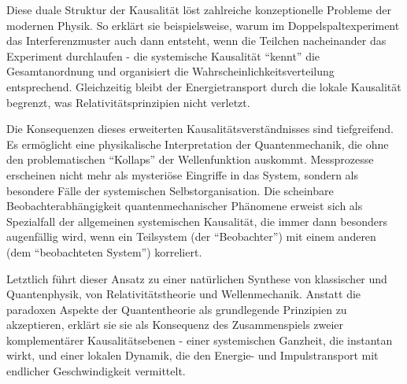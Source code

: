 Diese duale Struktur der Kausalität löst zahlreiche konzeptionelle Probleme der modernen Physik. So erklärt sie beispielsweise, warum im Doppelspaltexperiment das Interferenzmuster
auch dann entsteht, wenn die Teilchen nacheinander das Experiment durchlaufen - die systemische Kausalität \enquote{kennt} die Gesamtanordnung und organisiert die Wahrscheinlichkeitsverteilung
entsprechend. Gleichzeitig bleibt der Energietransport durch die lokale Kausalität begrenzt, was Relativitätsprinzipien nicht verletzt.

Die Konsequenzen dieses erweiterten Kausalitätsverständnisses sind tiefgreifend. Es ermöglicht eine physikalische Interpretation der Quantenmechanik, die ohne den problematischen
\enquote{Kollaps} der Wellenfunktion auskommt. Messprozesse erscheinen nicht mehr als mysteriöse Eingriffe in das System, sondern als besondere Fälle der systemischen Selbstorganisation.
Die scheinbare Beobachterabhängigkeit quantenmechanischer Phänomene erweist sich als Spezialfall der allgemeinen systemischen Kausalität, die immer dann besonders augenfällig wird, wenn
ein Teilsystem (der \enquote{Beobachter}) mit einem anderen (dem \enquote{beobachteten System}) korreliert.

Letztlich führt dieser Ansatz zu einer natürlichen Synthese von klassischer und Quantenphysik, von Relativitätstheorie und Wellenmechanik. Anstatt die paradoxen Aspekte der Quantentheorie
als grundlegende Prinzipien zu akzeptieren, erklärt sie sie als Konsequenz des Zusammenspiels zweier komplementärer Kausalitätsebenen - einer systemischen Ganzheit, die instantan wirkt,
und einer lokalen Dynamik, die den Energie- und Impulstransport mit endlicher Geschwindigkeit vermittelt.

